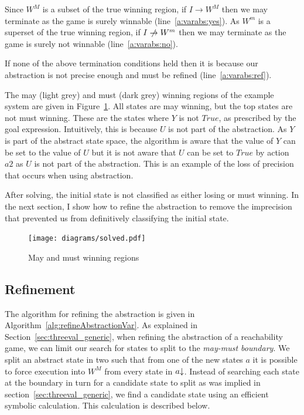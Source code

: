 Since $W^M$ is a subset of the true winning region, if $I \rightarrow W^M$ then we may terminate as the game is surely winnable (line~\ref{a:varabs:yes}). As $W^m$ is a superset of the true winning region, if $I \centernot\rightarrow W^m$ then we may terminate as the game is surely not winnable (line~\ref{a:varabs:no}).

If none of the above termination conditions held then it is because our abstraction is not precise enough and must be refined (line~\ref{a:varabs:ref}).

The may (light grey) and must (dark grey) winning regions of the example system are given in Figure~\ref{fig:may_must_win}. All states are may winning, but the top states are not must winning. These are the states where $Y$ is not $True$, as prescribed by the goal expression. Intuitively, this is because $U$ is not part of the abstraction. As $Y$ is part of the abstract state space, the algorithm is aware that the value of $Y$ can be set to the value of $U$ but it is not aware that $U$ can be set to $True$ by action $a2$ as $U$ is not part of the abstraction. This is an example of the loss of precision that occurs when using abstraction.

After solving, the initial state is not classified as either losing or must winning. In the next section, I show how to refine the abstraction to remove the imprecision that prevented us from definitively classifying the initial state. 

\begin{figure}[t]
\centering
\texttt{[image: diagrams/solved.pdf]}
\caption{May and must winning regions}
\label{fig:may_must_win}
\end{figure}

\subsection{Refinement}

The algorithm for refining the abstraction is given in Algorithm~\ref{alg:refineAbstractionVar}. As explained in Section~\ref{sec:threeval_generic}, when refining the abstraction of a reachability game, we can limit our search for states to split to the \emph{may-must boundary}. We split an abstract state in two such that from one of the new states $a$ it is possible to force execution into $W^M$ from every state in $a\mathord{\downarrow}$. Instead of searching each state at the boundary in turn for a candidate state to split as was implied in section~\ref{sec:threeval_generic}, we find a candidate state using an efficient symbolic calculation. This calculation is described below.


